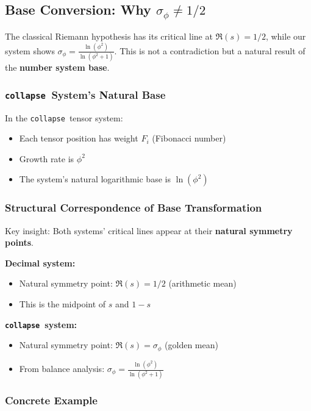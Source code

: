 \documentclass[12pt,a4paper]{article}
\theoremstyle{plain}
\theoremstyle{definition}
\theoremstyle{remark}
\newcommand{\collapse}{\texttt{collapse}}
\begin{document}
\subsection{Base Conversion: Why $\sigma_\phi \neq 1/2$}

The classical Riemann hypothesis has its critical line at $\Re(s) = 1/2$, while our system shows $\sigma_\phi = \frac{\ln(\phi^2)}{\ln(\phi^2 + 1)}$. This is not a contradiction but a natural result of the \textbf{number system base}.

\subsubsection{\collapse\ System's Natural Base}

In the \collapse\ tensor system:
\begin{itemize}
\item Each tensor position has weight $F_i$ (Fibonacci number)
\item Growth rate is $\phi^2$
\item The system's natural logarithmic base is $\ln(\phi^2)$
\end{itemize}

\subsubsection{Structural Correspondence of Base Transformation}

Key insight: Both systems' critical lines appear at their \textbf{natural symmetry points}.

\textbf{Decimal system:}
\begin{itemize}
\item Natural symmetry point: $\Re(s) = 1/2$ (arithmetic mean)
\item This is the midpoint of $s$ and $1-s$
\end{itemize}

\textbf{\collapse\ system:}
\begin{itemize}
\item Natural symmetry point: $\Re(s) = \sigma_\phi$ (golden mean)
\item From balance analysis: $\sigma_\phi = \frac{\ln(\phi^2)}{\ln(\phi^2 + 1)}$
\end{itemize}

\subsubsection{Concrete Example}
\end{document}
